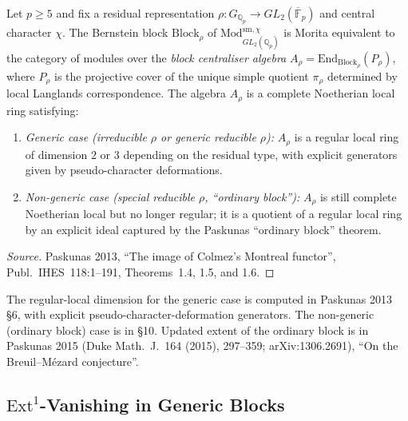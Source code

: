 \begin{theorem}
\label{v4-arith:w5-f:F1a3-AB:thm:Paskunas-centraliser}
\ClaimStatusProvedElsewhere Let \(p\geq 5\) and fix a residual
representation
\(\rho\colon G_{\mathbb{Q}_{p}}\to GL_{2}(\overline{\mathbb{F}}_{p})\)
and central character \(\chi\). The Bernstein block
\(\mathrm{Block}_{\rho}\) of
\(\mathrm{Mod}^{\mathrm{sm},\chi}_{GL_{2}(\mathbb{Q}_{p})}\) is
Morita equivalent to the category of modules over the
\emph{block centraliser algebra}
\(A_{\rho}=\mathrm{End}_{\mathrm{Block}_{\rho}}(P_{\rho})\), where
\(P_{\rho}\) is the projective cover of the unique simple quotient
\(\pi_{\rho}\) determined by local Langlands correspondence. The
algebra \(A_{\rho}\) is a complete Noetherian local ring
satisfying:
\begin{enumerate}
\item \emph{Generic case (irreducible \(\rho\) or generic reducible
\(\rho\)):} \(A_{\rho}\) is a regular local ring of dimension \(2\) or
\(3\) depending on the residual type, with explicit generators given
by pseudo-character deformations.
\item \emph{Non-generic case (special reducible \(\rho\),
``ordinary block''):} \(A_{\rho}\) is still complete Noetherian
local but no longer regular; it is a quotient of a regular local
ring by an explicit ideal captured by the Paskunas ``ordinary
block'' theorem.
\end{enumerate}
\end{theorem}

\begin{proof}[Source]
Paskunas 2013, ``The image of Colmez's Montreal functor'',
Publ.~IHES~118:1--191, Theorems~1.4, 1.5, and 1.6.
\end{proof}

\begin{remark}
\label{v4-arith:w5-f:F1a3-AB:rem:Paskunas-centraliser-location}
The regular-local dimension for the generic case is computed in
Paskunas 2013 \S 6, with explicit pseudo-character-deformation
generators. The non-generic (ordinary block) case is in \S 10.
Updated extent of the ordinary block is in Paskunas 2015
(Duke Math.\ J.\ 164 (2015), 297--359; arXiv:1306.2691), ``On
the Breuil--M\'ezard conjecture''.
\end{remark}

\subsection{\(\mathrm{Ext}^{1}\)-Vanishing in Generic Blocks}


